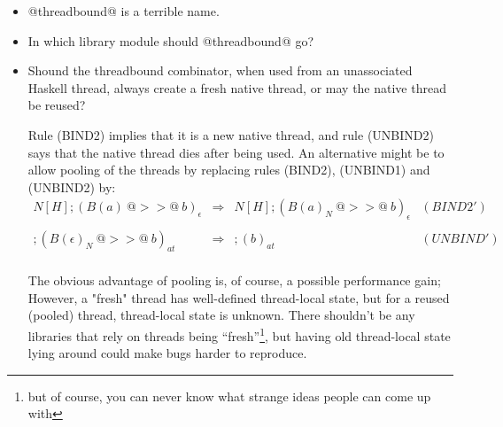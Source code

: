 \documentclass{article}
\newcommand{\hcall}{H}
\newcommand{\bound}[1]{B(#1)}
\begin{document}
\begin{itemize}
\item @threadbound@ is a terrible name.
\item In which library module should @threadbound@ go?
\item Shound the threadbound combinator, when used from an unassociated Haskell thread,
always create a fresh native thread, or may the native thread be reused?

Rule (BIND2) implies that it is a new native thread, and rule (UNBIND2) says that the
native thread dies after being used. An alternative might be to allow pooling of
the threads by replacing rules (BIND2), (UNBIND1) and (UNBIND2) by:
$$
\begin{array}{rcll}
N[\hcall]; (\bound{a}~@>>@~b)_{\epsilon} 
	& \Rightarrow 
	& N[\hcall]; (\bound{a}_N~@>>@~b)_{\epsilon} & (BIND2') \\
\\
; (\bound{\epsilon}_N~@>>@~b)_{at}
	& \Rightarrow 
	& ; (b)_{at} & (UNBIND') \\
\end{array}
$$

The obvious advantage of pooling is, of course, a possible performance gain;
However, a "fresh" thread has well-defined thread-local state, but for a 
reused (pooled) thread, thread-local state is unknown. There shouldn't be
any libraries that rely on threads being ``fresh''\footnote{but of course,
you can never know what strange ideas people can come up with}, but having old
thread-local state lying around could make bugs harder to reproduce.

\end{itemize}
\end{document}
